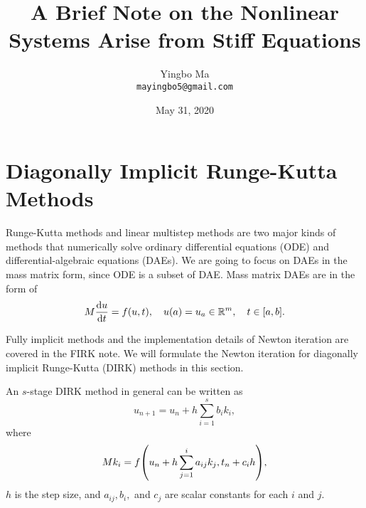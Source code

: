\documentclass[a4paper,9pt]{article}
\theoremstyle{definition}
\theoremstyle{remark}
\begin{document}
\author{Yingbo Ma\\
        \tt{mayingbo5@gmail.com}}
\title{A Brief Note on the Nonlinear Systems Arise from Stiff Equations}
\date{May 31, 2020}

\maketitle

\section{Diagonally Implicit Runge-Kutta Methods}
Runge-Kutta methods and linear multistep methods are two major kinds of methods
that numerically solve ordinary differential equations (ODE) and
differential-algebraic equations (DAEs). We are going to focus on DAEs in the
mass matrix form, since ODE is a subset of DAE. Mass matrix DAEs are in the form
of
\begin{equation}
  M \dv{u}{t} = f(u, t),\quad u(a)=u_a \in \mathbb{R}^m, \quad t\in [a, b].
\end{equation}

Fully implicit methods and the implementation details of Newton iteration are
covered in the FIRK note. We will formulate the Newton iteration for diagonally
implicit Runge-Kutta (DIRK) methods in this section.

An $s$-stage DIRK method in general can be written as
\begin{equation}
  u_{n+1} = u_n + h \sum_{i=1}^s b_i k_i,
\end{equation}
where
\begin{equation}
  M k_i = f\qty(u_n + h\sum_{j=1}^i a_{ij} k_j, t_{n}+c_{i}h),
\end{equation}
$h$ is the step size, and $a_{ij}, b_i,$ and $c_j$ are scalar constants for each
$i$ and $j$.
\end{document}
